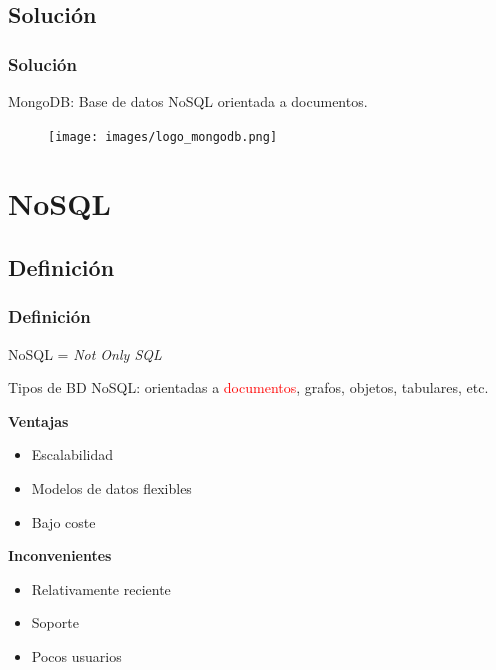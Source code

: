 \documentclass[serif,12pt]{beamer}
\begin{document}
\subsection{Solución}

\begin{frame}
\frametitle{Solución}

MongoDB: Base de datos NoSQL orientada a documentos.

\begin{figure}
\centering
\texttt{[image: images/logo\_mongodb.png]} 
\label{fig:mongo_logo}
\end{figure}

\end{frame}



\section{NoSQL}
\subsection{Definición}
\begin{frame}
\frametitle{Definición}

\begin{center}
NoSQL = \emph{Not Only SQL}
\end{center}

Tipos de BD NoSQL: orientadas a \textcolor{red}{documentos}, grafos, objetos, tabulares, etc.\newline


\begin{multicols}{2}

\textbf{Ventajas}
\begin{itemize}
\item Escalabilidad
\item Modelos de datos flexibles
\item Bajo coste
\end{itemize}

\textbf{Inconvenientes}
\begin{itemize}
\item Relativamente reciente
\item Soporte
\item Pocos usuarios
\end{itemize}

\end{multicols}

\end{frame}
\end{document}
